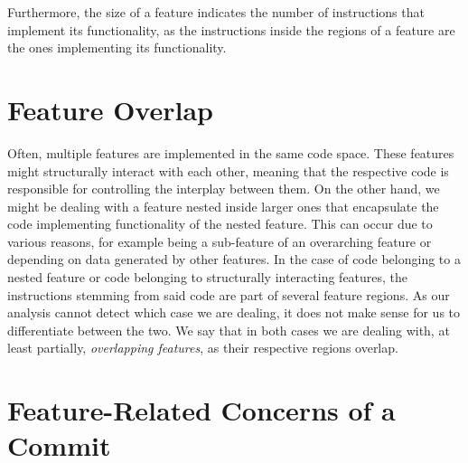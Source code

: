 Furthermore, the size of a feature indicates the number of instructions that implement its functionality, as the instructions inside the regions of a feature are the ones implementing its functionality.

\section{Feature Overlap}\label{sec:feature_overlap}

Often, multiple features are implemented in the same code space.
These features might structurally interact with each other, meaning that the respective code is responsible for controlling the interplay between them.
On the other hand, we might be dealing with a feature nested inside larger ones that encapsulate the code implementing functionality of the nested feature.
This can occur due to various reasons, for example being a sub-feature of an overarching feature or depending on data generated by other features.
In the case of code belonging to a nested feature or code belonging to structurally interacting features, the instructions stemming from said code are part of several feature regions.
As our analysis cannot detect which case we are dealing, it does not make sense for us to differentiate between the two.
We say that in both cases we are dealing with, at least partially, \emph{overlapping features}, as their respective regions overlap.

\section{Feature-Related Concerns of a Commit}\label{sec:commit_concerns}

